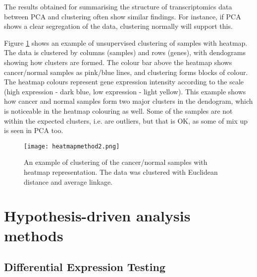     The results obtained for summarising the structure of transcriptomics data between PCA and clustering often show similar findings. For instance, if PCA shows a clear segregation of the data, clustering normally will support this.
    
    Figure \ref{fig:heatmapmethod} shows an example of unsupervised clustering of samples with heatmap. The data is clustered by columns (samples) and rows (genes), with dendograms showing how clusters are formed. The colour bar above the heatmap shows cancer/normal samples as pink/blue lines, and clustering forms blocks of colour. The heatmap colours  represent gene expression intensity according to the scale (high expression - dark blue, low expression - light yellow). This example shows how cancer and normal samples form two major clusters in the dendogram, which is noticeable in the heatmap colouring as well. Some of the samples are not within the expected clusters, i.e. are outliers, but that is OK, as some of mix up is seen in PCA too. 
    
            \begin{figure}[h]
            \centering
            \texttt{[image: heatmapmethod2.png]}
            \caption{An example of clustering of the cancer/normal samples with heatmap representation. The data was clustered with Euclidean distance and average linkage. }
            \label{fig:heatmapmethod}
            \end{figure}
    
    
    
\newpage



\section{Hypothesis-driven analysis methods}    


    \subsection{Differential Expression Testing}
    
